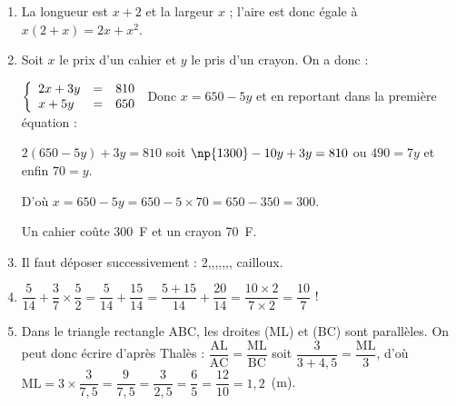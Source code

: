 \begin{enumerate}
\item La longueur est $x + 2$ et la largeur $x$ ; l'aire est donc égale à $x(2 + x) = 2x + x^2$.
\item Soit $x$ le prix d'un cahier et $y$ le pris d'un crayon. On a donc :

$\left\{\begin{array}{l c l}
2x + 3y&=&810\\
x + 5y &=& 650
\end{array}\right.$ Donc $x = 650 - 5y$ et en reportant dans la première équation :

$2(650 - 5y) + 3y = 810 $ soit $\np{1300}  - 10y + 3y = 810$ ou  $490 = 7y$ et enfin $70 = y$.

D'où $x = 650 - 5y = 650 - 5 \times 70 = 650 - 350 = 300$.

Un cahier coûte 300~F et un crayon 70~F.
\item Il faut déposer successivement : 2,,,,,,, cailloux.
\item $\dfrac{5}{14} + \dfrac{3}{7} \times \dfrac{5}{2} = \dfrac{5}{14} + \dfrac{15}{14} = \dfrac{5 + 15}{14} + \dfrac{20}{14}  = \dfrac{10 \times 2}{7 \times 2}  = \dfrac{10}{7}$ !
\item Dans le triangle rectangle ABC, les droites (ML) et (BC) sont parallèles. On peut donc écrire d'après Thalès : $\dfrac{\text{AL}}{\text{AC}} = \dfrac{\text{ML}}{\text{BC}}$ soit $\dfrac{3}{3 + 4,5} = \dfrac{\text{ML}}{3}$, d'où $\text{ML} = 3 \times \dfrac{3}{7,5} = \dfrac{9}{7,5} = \dfrac{3}{2,5} = \dfrac{6}{5} = \dfrac{12}{10} = 1,2$~(m). 
\end{enumerate}

\vspace{0,5cm}

